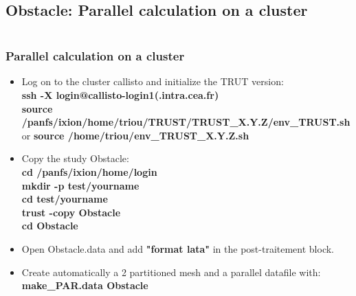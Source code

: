 \documentclass[10pt]{beamer}
\begin{document}
\subsection{Obstacle: Parallel calculation on a cluster}
\begin{frame}
\begin{columns}[c] 
\tableofcontents[sections={1-7},currentsection, currentsubsection]
\tableofcontents[sections={8-13},currentsection, currentsubsection]
\end{columns}
\end{frame}
\begin{frame}
\frametitle{Parallel calculation on a cluster}
\begin{block}{}

\begin{itemize}
\item Log on to the cluster callisto and initialize the TRUT version: \\
\vspace{0.2cm}
{\small{
\textbf{ssh -X login@callisto-login1(.intra.cea.fr)} \\
\textbf{source /panfs/ixion/home/triou/TRUST/TRUST\_X.Y.Z/env\_TRUST.sh}\\
or 
\textbf{source /home/triou/env\_TRUST\_X.Y.Z.sh}\\
}}
\vspace{0.2cm}

\item Copy the study Obstacle:\\
\vspace{0.2cm}
\textbf{cd /panfs/ixion/home/login}\\
\textbf{mkdir  -p  test/yourname} \\
\textbf{cd test/yourname} \\
\textbf{trust -copy Obstacle} \\
\textbf{cd Obstacle} \\
\vspace{0.2cm}

\item Open Obstacle.data and add \textbf{"format lata"} in the post-traitement block.
\vspace{0.2cm}

\item Create automatically a 2 partitioned mesh and a parallel datafile with:
\vspace{0.2cm}
\textbf{make\_PAR.data Obstacle}
\end{itemize}

\end{block}
\end{frame}
\end{document}
